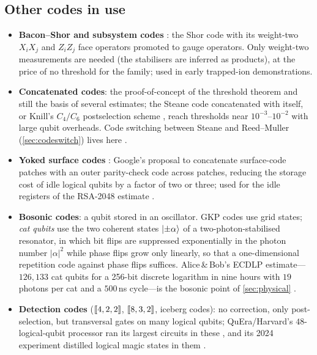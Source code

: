 \subsection{Other codes in use}\label{sec:othercodes}
\begin{itemize}[leftmargin=*]
\item \textbf{Bacon--Shor and subsystem codes} \cite{bacon06}: the Shor code with its weight-two $X_iX_j$ and $Z_iZ_j$ face operators promoted to gauge operators. Only weight-two measurements are needed (the stabilisers are inferred as products), at the price of no threshold for the family; used in early trapped-ion demonstrations.
\item \textbf{Concatenated codes}: the proof-of-concept of the threshold theorem and still the basis of several estimates; the Steane code concatenated with itself, or Knill's $C_4/C_6$ postselection scheme \cite{knill05}, reach thresholds near $10^{-3}$--$10^{-2}$ with large qubit overheads. Code switching between Steane and Reed--Muller (\cref{sec:codeswitch}) lives here \cite{anderson14,paetznick-reichardt13}.
\item \textbf{Yoked surface codes} \cite{yoked23}: Google's proposal to concatenate surface-code patches with an outer parity-check code across patches, reducing the storage cost of idle logical qubits by a factor of two or three; used for the idle registers of the RSA-2048 estimate \cite{gidney25rsa}.
\item \textbf{Bosonic codes}: a qubit stored in an oscillator. GKP codes \cite{gkp01} use grid states; \emph{cat qubits} \cite{guillaud19} use the two coherent states $\lvert \pm\alpha \rangle$ of a two-photon-stabilised resonator, in which bit flips are suppressed exponentially in the photon number $|\alpha|^2$ while phase flips grow only linearly, so that a one-dimensional repetition code against phase flips suffices. Alice\,\&\,Bob's ECDLP estimate---$126{,}133$ cat qubits for a 256-bit discrete logarithm in nine hours with $19$ photons per cat and a $500$\,ns cycle---is the bosonic point of \cref{sec:physical} \cite{gouzien23}.
\item \textbf{Detection codes} ($[\![4,2,2]\!]$, $[\![8,3,2]\!]$, iceberg codes): no correction, only post-selection, but transversal gates on many logical qubits; QuEra/Harvard's $48$-logical-qubit processor ran its largest circuits in these \cite{bluvstein24}, and its 2024 experiment distilled logical magic states in them \cite{rodriguez24distill}.
\end{itemize}
